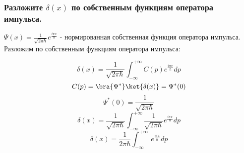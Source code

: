 \subsubsection{Разложите $\delta(x)$  по собственным функциям оператора импульса.}


$\Psi(x)=\frac{1}{\sqrt{2\pi \hbar}}e^{\frac{i\pi x}{\hbar}}$ - нормированная собственная функция оператора импульса. Разложим по собственным функциям оператора импульса:

$$\delta(x) = \frac{1}{\sqrt{2\pi \hbar}}\int_{-\infty}^{+\infty} C(p) e^{\frac{i\pi x}{\hbar}} dp$$
$$C(p)=\bra{\Psi^*} \ket{\delta(x)}=\Psi^*(0)$$
$$\Psi^*(0)=\frac{1}{\sqrt{2\pi \hbar}}$$
$$\delta(x) = \frac{1}{\sqrt{2\pi \hbar}}\int_{-\infty}^{+\infty} \frac{1}{\sqrt{2\pi \hbar}} e^{\frac{i\pi x}{\hbar}} dp$$
$$\delta(x) = \frac{1}{2\pi \hbar}\int_{-\infty}^{+\infty} \ e^{\frac{i\pi x}{\hbar}} dp$$